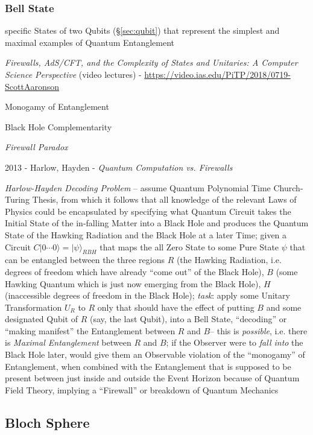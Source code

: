 \subsubsection{Bell State}\label{sec:bell_state}

specific States of two Qubits (\S\ref{sec:qubit}) that represent the simplest
and maximal examples of Quantum Entanglement

\emph{Firewalls, AdS/CFT, and the Complexity of States and Unitaries: A Computer
  Science Perspective}
(video lectures)
-
\url{https://video.ias.edu/PiTP/2018/0719-ScottAaronson}

Monogamy of Entanglement

Black Hole Complementarity

\emph{Firewall Paradox}

2013 - Harlow, Hayden - \emph{Quantum Computation vs. Firewalls}

\emph{Harlow-Hayden Decoding Problem} -- assume Quantum Polynomial Time
Church-Turing Thesis, from which it follows that all knowledge of the relevant
Laws of Physics could be encapsulated by specifying what Quantum Circuit takes
the Initial State of the in-falling Matter into a Black Hole and produces the
Quantum State of the Hawking Radiation and the Black Hole at a later Time; given
a Circuit $C|0 \cdots 0\rangle = |\psi\rangle_{RBH}$ that maps the all Zero
State to some Pure State $\psi$ that can be entangled between the three regions
$R$ (the Hawking Radiation, i.e. degrees of freedom which have already ``come
out'' of the Black Hole), $B$ (some Hawking Quantum which is just now emerging
from the Black Hole), $H$ (inaccessible degrees of freedom in the Black Hole);
\emph{task}: apply some Unitary Transformation $U_R$ to $R$ only that should
have the effect of putting $B$ and some designated Qubit of $R$ (say, the last
Qubit), into a Bell State, ``decoding'' or ``making manifest'' the Entanglement
between $R$ and $B$-- this is \emph{possible}, i.e. there is \emph{Maximal
  Entanglement} between $R$ and $B$; if the Observer were to \emph{fall into}
the Black Hole later, would give them an Observable violation of the
``monogamy'' of Entanglement, when combined with the Entanglement that is
supposed to be present between just inside and outside the Event Horizon because
of Quantum Field Theory, implying a ``Firewall'' or breakdown of Quantum
Mechanics



\subsection{Bloch Sphere}\label{sec:bloch_sphere}

